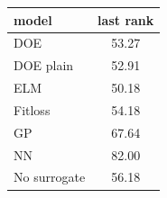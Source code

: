 \begin{tabular}{|lc|}
\hline
model & last rank\\
\hline
DOE & 53.27 \\
DOE plain & 52.91 \\
ELM & 50.18 \\
Fitloss & 54.18 \\
GP & 67.64 \\
NN & 82.00 \\
No surrogate & 56.18 \\
\hline
\end{tabular}
